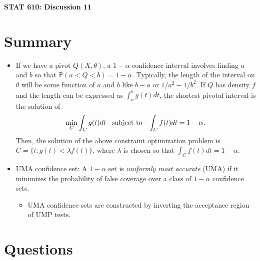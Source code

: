 \documentclass[12pt]{extarticle}
\newcommand{\p}{\mathbb P}
\begin{document}
\begin{center}
{\large \bf STAT 610: Discussion 11}
\end{center}
\vspace{0.22cm}

\section{Summary}
\begin{itemize}
	\item If we have a pivot $Q(X,\theta)$, a $1-\alpha$ confidence interval involves finding $a$ and $b$ so that $\p(a<Q<b) = 1-\alpha$. Typically, the length of the interval on $\theta$ will be some function of $a$ and $b$ like $b-a$ or $1/a^2 - 1/b^2$. If $Q$ has density $f$ and the length can be expressed as $\int_a^bg(t)dt$, the shortest pivotal interval is the solution of 
	$$\min_{C}\int_C g(t)dt \hspace{3mm} \text{subject to}  \hspace{3mm} \int_C f(t)dt = 1-\alpha.$$
	Then, the solution of the above constraint optimization problem is $C = \{t: g(t)<\lambda f(t)\}$, where $\lambda$ is chosen so that $\int_C f(t)dt = 1-\alpha$.
	\item UMA confidence set: A $1 - \alpha$ set is \textit{uniformly most accurate} (UMA) if it minimizes the probability of false coverage over a class of $1-\alpha$ confidence sets.
	\begin{itemize}
		\item UMA confidence sets are constructed by inverting the acceptance region of UMP tests.
	\end{itemize}
\end{itemize}

\section{Questions}
 
\end{document}

